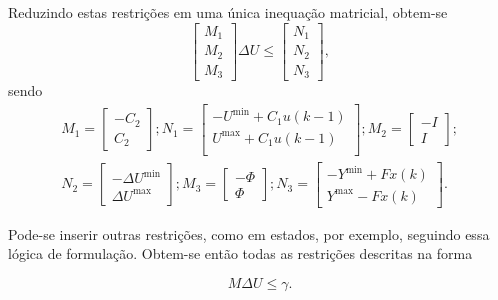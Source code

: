 Reduzindo estas restrições em uma única inequação matricial, obtem-se
%
\begin{equation}
	\label{eq:generic-restriction-matrix}
	\begin{bmatrix}
		M_1 \\
		M_2 \\
		M_3
	\end{bmatrix} \Delta{}U \le
	\begin{bmatrix}
		N_1 \\
		N_2 \\
		N_3
	\end{bmatrix},
\end{equation}
%
sendo
%
\begin{equation}
	\begin{split}
		M_1 =
		\begin{bmatrix}
			-C_2 \\
			C_2
		\end{bmatrix};
		N_1 =
		\begin{bmatrix}
			-U^{\min} + C_1u(k-1) \\
			U^{\max} + C_1u(k-1)  \\
		\end{bmatrix};
		M_2 =
		\begin{bmatrix}
			-I \\
			I
		\end{bmatrix}; \\
		N_2 =
		\begin{bmatrix}
			-\Delta{}U^{\min} \\
			\Delta{}U^{\max}
		\end{bmatrix};
		M_3 =
		\begin{bmatrix}
			-\Phi \\
			\Phi
		\end{bmatrix};
		N_3 =
		\begin{bmatrix}
			-Y^{\min} + Fx(k) \\
			Y^{\max} - Fx(k)
		\end{bmatrix}.
	\end{split}
\end{equation}

Pode-se inserir outras restrições, como em estados, por exemplo, seguindo essa
lógica de formulação. Obtem-se então todas as restrições descritas na forma

\begin{equation}
	\label{eq:generic-restriction-formulation}
	M\Delta{}U \le \gamma.
\end{equation}

